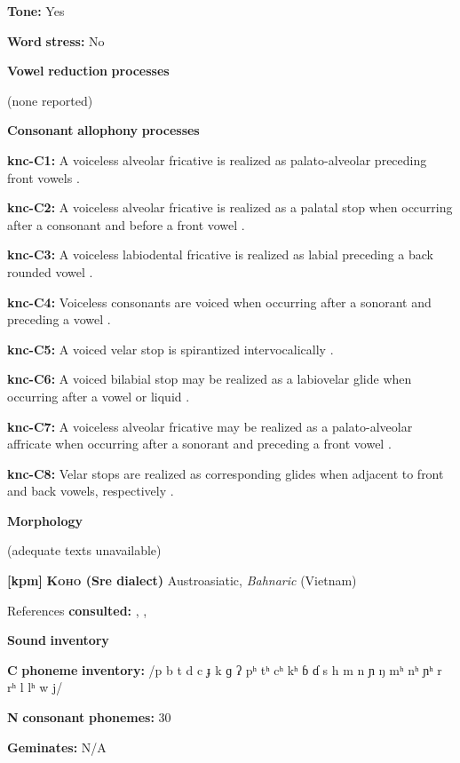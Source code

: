\begin{styleBody}
\textbf{Tone:} Yes

\textbf{Word} \textbf{stress:} No

\textbf{Vowel} \textbf{reduction} \textbf{processes}

(none reported)

\textbf{Consonant} \textbf{allophony} \textbf{processes}

\textbf{knc-C1:} A voiceless alveolar fricative is realized as palato-alveolar preceding front vowels \citep[20]{Cyffer1998}.

\textbf{knc-C2:} A voiceless alveolar fricative is realized as a palatal stop when occurring after a consonant and before a front vowel \citep[21]{Cyffer1998}.

\textbf{knc-C3:} A voiceless labiodental fricative is realized as labial preceding a back rounded vowel \citep[23]{Cyffer1998}.

\textbf{knc-C4:} Voiceless consonants are voiced when occurring after a sonorant and preceding a vowel \citep[22]{Cyffer1998}.

\textbf{knc-C5:} A voiced velar stop is spirantized intervocalically \citep[22]{Cyffer1998}.

\textbf{knc-C6:} A voiced bilabial stop may be realized as a labiovelar glide when occurring after a vowel or liquid \citep[22]{Cyffer1998}.

\textbf{knc-C7:} A voiceless alveolar fricative may be realized as a palato-alveolar affricate when occurring after a sonorant and preceding a front vowel \citep[21]{Cyffer1998}.

\textbf{knc-C8:} Velar stops are realized as corresponding glides when adjacent to front and back vowels, respectively \citep[22]{Cyffer1998}.

\textbf{Morphology}

(adequate texts unavailable)

\textbf{[kpm]}   \textbf{\textsc{Koho} \textbf{(Sre} \textbf{dialect)}}  Austroasiatic, \textit{Bahnaric} (Vietnam)

References \textbf{consulted:} \citet{LadefogedMaddieson1996}, \citet{Manley1972}, \citet{Olsen2014}

\textbf{Sound} \textbf{inventory}

\textbf{C} \textbf{phoneme} \textbf{inventory:} /p b t d c ɟ k ɡ ʔ pʰ tʰ cʰ kʰ ɓ ɗ s h m n ɲ ŋ mʰ nʰ ɲʰ r rʰ l lʰ w j/

\textbf{N} \textbf{consonant} \textbf{phonemes:} 30

\textbf{Geminates:} N/A


\end{styleBody}
